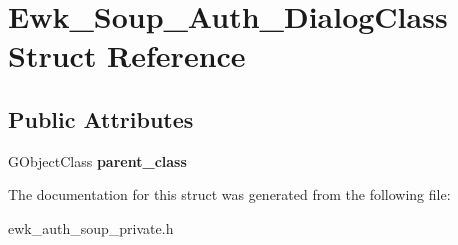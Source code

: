 \hypertarget{structEwk__Soup__Auth__DialogClass}{\section{Ewk\+\_\+\+Soup\+\_\+\+Auth\+\_\+\+Dialog\+Class Struct Reference}
\label{structEwk__Soup__Auth__DialogClass}
}
\subsection*{Public Attributes}
\begin{DoxyCompactItemize}
\item 
\hypertarget{structEwk__Soup__Auth__DialogClass_aeaf699221399640df822109fb5a67224}{G\+Object\+Class {\bfseries parent\+\_\+class}}\label{structEwk__Soup__Auth__DialogClass_aeaf699221399640df822109fb5a67224}

\end{DoxyCompactItemize}


The documentation for this struct was generated from the following file\+:\begin{DoxyCompactItemize}
\item 
ewk\+\_\+auth\+\_\+soup\+\_\+private.\+h\end{DoxyCompactItemize}
